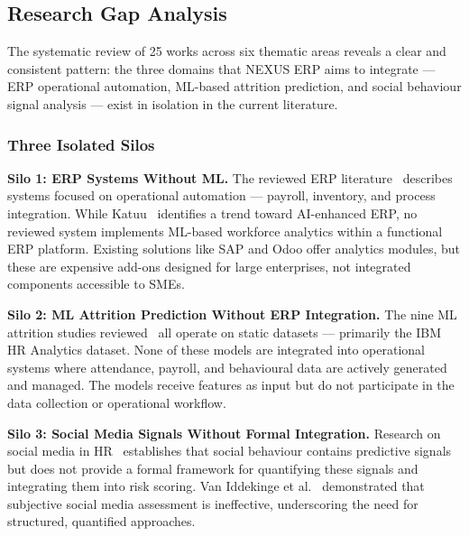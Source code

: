 \documentclass[12pt,a4paper]{article}
\begin{document}
\subsection{Research Gap Analysis}
\label{sec:gap-analysis}

The systematic review of 25 works across six thematic areas reveals a clear and consistent pattern: the three domains that NEXUS ERP aims to integrate --- ERP operational automation, ML-based attrition prediction, and social behaviour signal analysis --- exist in isolation in the current literature.

\subsubsection{Three Isolated Silos}

\textbf{Silo 1: ERP Systems Without ML.} The reviewed ERP literature~\cite{davenport1998erp, katuu2020erp, albarghouthi2024cloud, chofreh2021cloud} describes systems focused on operational automation --- payroll, inventory, and process integration. While Katuu~\cite{katuu2020erp} identifies a trend toward AI-enhanced ERP, no reviewed system implements ML-based workforce analytics within a functional ERP platform. Existing solutions like SAP and Odoo offer analytics modules, but these are expensive add-ons designed for large enterprises, not integrated components accessible to SMEs.

\textbf{Silo 2: ML Attrition Prediction Without ERP Integration.} The nine ML attrition studies reviewed~\cite{alao2013attrition, yadav2018attrition, srivastava2018attrition, zhao2018turnover, fallucchi2020attrition, jain2022ensemble, raza2022stacking, osman2025attrition, sajjadiani2019ml} all operate on static datasets --- primarily the IBM HR Analytics dataset. None of these models are integrated into operational systems where attendance, payroll, and behavioural data are actively generated and managed. The models receive features as input but do not participate in the data collection or operational workflow.

\textbf{Silo 3: Social Media Signals Without Formal Integration.} Research on social media in HR~\cite{vaniddekinge2016facebook, roth2016socialmedia, dejesus2018linkedin, gupta2022hr} establishes that social behaviour contains predictive signals but does not provide a formal framework for quantifying these signals and integrating them into risk scoring. Van Iddekinge et al.~\cite{vaniddekinge2016facebook} demonstrated that subjective social media assessment is ineffective, underscoring the need for structured, quantified approaches.
\end{document}
